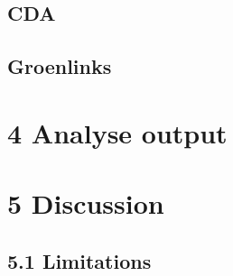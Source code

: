 \documentclass[11pt,]{article}
\begin{document}
\subsection{CDA}\label{cda-1}

\subsection{Groenlinks}\label{groenlinks-1}

\section{4 Analyse output}\label{analyse-output}

\section{5 Discussion}\label{discussion}

\subsection{5.1 Limitations}\label{limitations}
\end{document}
